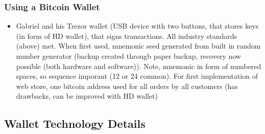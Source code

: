 \documentclass[english, 11pt]{article}
\begin{document}
\subsubsection{Using a Bitcoin Wallet}
\begin{itemize}
    \item Gabriel and his Trezor wallet (USB device with two buttons, that stores keys (in form of HD wallet), that signs transactions. All industry standards (above) met. When first used, mnemonic seed generated from built in random number generator (backup created througb paper backup, recovery now possible (both hardware and software)). Note, mnemonic in form of numbered spaces, so sequence imporant (12 or 24 common). For first implementation of web store, one bitcoin address used for all orders by all customers (has drawbacks, can be improved with HD wallet)
\end{itemize}
\subsection{Wallet Technology Details}
\end{document}
